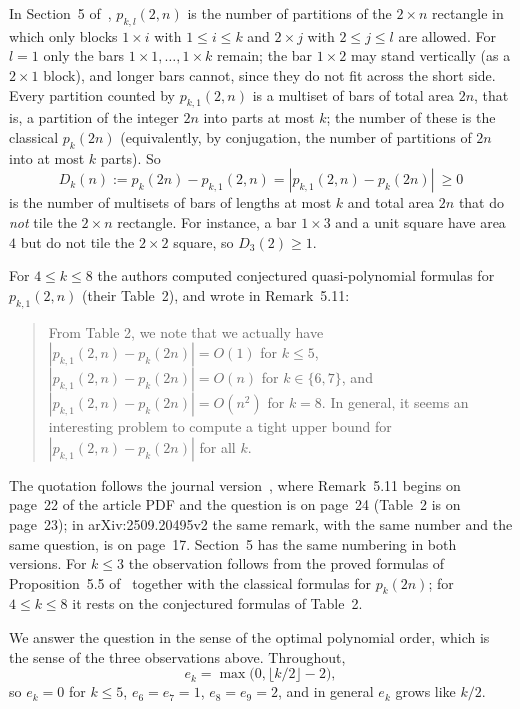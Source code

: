 \documentclass[11pt]{article}
\theoremstyle{definition}
\theoremstyle{remark}
\begin{document}
In Section~5 of~\cite{gvz}, $p_{k,l}(2,n)$ is the number of partitions of the
$2\times n$ rectangle in which only blocks $1\times i$ with $1\le i\le k$ and
$2\times j$ with $2\le j\le l$ are allowed. For $l=1$ only the bars
$1\times1,\dots,1\times k$ remain; the bar $1\times2$ may stand vertically (as
a $2\times1$ block), and longer bars cannot, since they do not fit across the
short side. Every partition counted by $p_{k,1}(2,n)$ is a multiset of bars of
total area $2n$, that is, a partition of the integer $2n$ into parts at most
$k$; the number of these is the classical $p_k(2n)$ (equivalently, by
conjugation, the number of partitions of $2n$ into at most $k$ parts). So
\[
D_k(n):=p_k(2n)-p_{k,1}(2,n)=|p_{k,1}(2,n)-p_k(2n)|\ \ge 0
\]
is the number of multisets of bars of lengths at most $k$ and total area $2n$
that do \emph{not} tile the $2\times n$ rectangle. For instance, a bar
$1\times3$ and a unit square have area $4$ but do not tile the $2\times2$
square, so $D_3(2)\ge1$.

For $4\le k\le8$ the authors computed conjectured quasi-polynomial formulas for
$p_{k,1}(2,n)$ (their Table~2), and wrote in Remark~5.11:

\begin{quote}
From Table 2, we note that we actually have $|p_{k,1}(2,n)-p_k(2n)|=O(1)$
for $k\le5$, $|p_{k,1}(2,n)-p_k(2n)|=O(n)$ for $k\in\{6,7\}$, and
$|p_{k,1}(2,n)-p_k(2n)|=O(n^2)$ for $k=8$. In general, it seems an
interesting problem to compute a tight upper bound for
$|p_{k,1}(2,n)-p_k(2n)|$ for all $k$.
\end{quote}

\noindent The quotation follows the journal version~\cite{gvz}, where
Remark~5.11 begins on page~22 of the article PDF and the question is on
page~24 (Table~2 is on page~23); in arXiv:2509.20495v2 the same remark, with
the same number and the same question, is on page~17. Section~5 has the same
numbering in both versions. For $k\le3$ the observation follows from the proved formulas of
Proposition~5.5 of~\cite{gvz} together with the classical formulas for
$p_k(2n)$; for $4\le k\le8$ it rests on
the conjectured formulas of Table~2.

We answer the question in the sense of the optimal polynomial order, which is
the sense of the three observations above. Throughout,
\[
e_k=\max\bigl(0,\lfloor k/2\rfloor-2\bigr),
\]
so $e_k=0$ for $k\le5$, $e_6=e_7=1$, $e_8=e_9=2$, and in general $e_k$ grows
like $k/2$.
\end{document}
